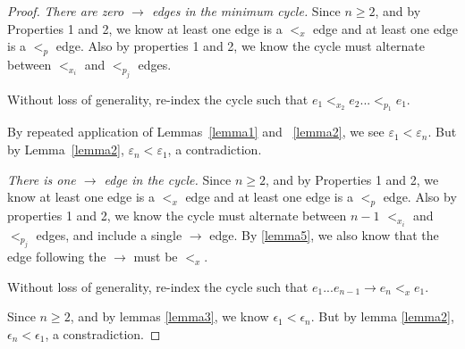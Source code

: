 \begin{proof}
 \textit{There are zero $\rightarrow$ edges in the minimum cycle.} Since $n \geq 2$, and by Properties 1 and 2, we know at least one edge is a $<_x$ edge and at least one edge is a $<_p$ edge. Also by properties 1 and 2, we know the cycle must alternate between $<_{x_i}$ and $<_{p_j}$ edges. 

Without loss of generality, re-index the cycle such that $e_1 <_{x_2} e_2 ... <_{p_1} e_1$.

By repeated application of Lemmas~\ref{lemma1} and ~\ref{lemma2}, we see $\varepsilon_1 < \varepsilon_n$. But by Lemma~\ref{lemma2}, $\varepsilon_n < \varepsilon_1$, a contradiction.

 \textit{There is one $\rightarrow$ edge in the cycle.}
Since $n \geq 2$, and by Properties 1 and 2, we know at least one edge is a $<_x$ edge and at least one edge is a $<_p$ edge. Also by properties 1 and 2, we know the cycle must alternate between $n-1$ $<_{x_i}$ and $<_{p_j}$ edges, and include a single $\rightarrow$ edge. By \ref{lemma5}, we also know that the edge following the $\rightarrow$ must be $<_x$. 

Without loss of generality, re-index the cycle such that $e_1 ... e_{n-1} \rightarrow e_n <_x e_1$.


Since $n \geq 2$, and by lemmas \ref{lemma3}, we know $\epsilon_1 < \epsilon_n$. But by lemma \ref{lemma2}, $\epsilon_n < \epsilon_1$, a constradiction.
\end{proof}